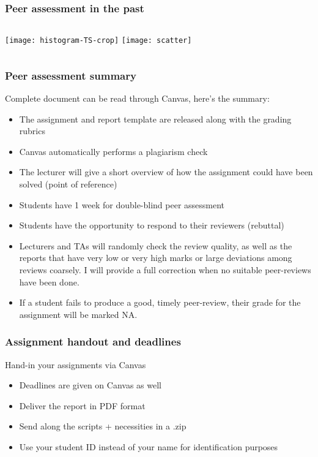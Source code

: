 \begin{frame}
  \frametitle{Peer assessment in the past}
  \begin{columns}
    \centering
      \texttt{[image: histogram-TS-crop]}
    \centering
      \texttt{[image: scatter]}   
  \end{columns}
 \end{frame}

 \begin{frame}
  \frametitle{Peer assessment summary}
  Complete document can be read through Canvas, here's the summary:
  \begin{itemize}
    \item The assignment and report template are released along with the grading rubrics
    \item Canvas automatically performs a plagiarism check
    \item The lecturer will give a short overview of how the assignment could have been solved (point of reference)
    \item Students have 1 week for double-blind peer assessment
    \item Students have the opportunity to respond to their reviewers (rebuttal)
    \item Lecturers and TAs will randomly check the review quality, as well as the reports that have very low or very high marks or large deviations among reviews coarsely. I will provide a full correction when no suitable peer-reviews have been done.
    \item If a student fails to produce a good, timely peer-review, their grade for the assignment will be marked NA.
  \end{itemize}
 \end{frame}
%
\begin{frame}
 \frametitle{Assignment handout and deadlines}
     Hand-in your assignments via Canvas
    \begin{itemize}
      \item Deadlines are given on Canvas as well
      \item Deliver the report in PDF format
      \item Send along the scripts + necessities in a .zip
      \item Use your student ID instead of your name for identification purposes
    \end{itemize}
\end{frame}



